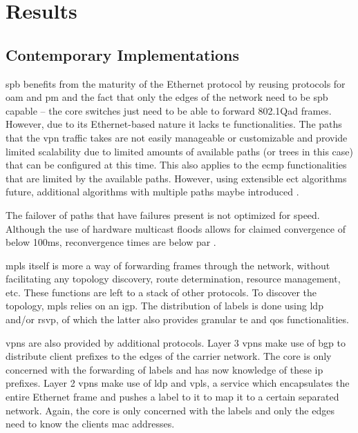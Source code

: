 \section{Results} %
\label{sec:results}

\subsection{Contemporary Implementations} %
\label{sub:contemporary_implementations}


\ac{spb} benefits from the maturity of the Ethernet protocol by reusing protocols for \ac{oam} and \ac{pm} and the fact that only the edges of the network need to be \ac{spb} capable -- the core switches just need to be able to forward 802.1Qad frames. However, due to its Ethernet-based nature it lacks \ac{te} functionalities. The paths that the \ac{vpn} traffic takes are not easily manageable or customizable and provide limited scalability due to limited amounts of available paths (or trees in this case) that can be configured at this time. This also applies to the \ac{ecmp} functionalities that are limited by the available paths. However, using extensible \ac{ect} algorithms future, additional algorithms with multiple paths maybe introduced \cite{rfc6329}. 

The failover of paths that have failures present is not optimized for speed. Although the use of hardware multicast floods allows for claimed convergence of below 100ms, reconvergence times are below par \cite{spb-nanog}.


\ac{mpls} itself is more a way of forwarding frames through the network, without facilitating any topology discovery, route determination, resource management, etc. These functions are left to a stack of other protocols. To discover the topology, \ac{mpls} relies on an \ac{igp}. The distribution of labels is done using \ac{ldp} and/or \ac{rsvp}, of which the latter also provides granular \ac{te} and \ac{qos} functionalities.

\acp{vpn} are also provided by additional protocols. Layer 3 \acp{vpn} make use of \ac{bgp} to distribute client prefixes to the edges of the carrier network. The core is only concerned with the forwarding of labels and has now knowledge of these \acs{ip} prefixes. Layer 2 \acp{vpn} make use of \ac{ldp} and \ac{vpls}, a service which encapsulates the entire Ethernet frame and pushes a label to it to map it to a certain separated network. Again, the core is only concerned with the labels and only the edges need to know the clients \acs{mac} addresses. 

